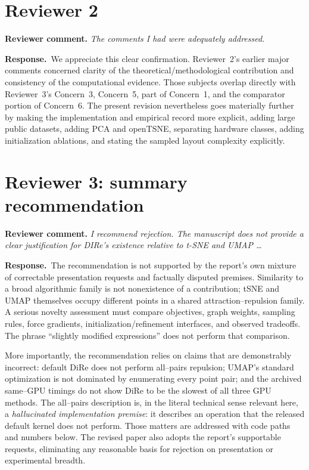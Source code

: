 \documentclass[11pt]{article}
\newcommand{\reviewcomment}[1]{%
  \medskip\noindent\textbf{Reviewer comment.} \emph{#1}\par\smallskip}
\newcommand{\response}{%
  \noindent\textcolor{responseblue}{\textbf{Response.}}\ }
\begin{document}
\section*{Reviewer 2}

\reviewcomment{The comments I had were adequately addressed.}

\response We appreciate this clear confirmation. Reviewer~2's earlier major
comments concerned clarity of the theoretical/methodological contribution and
consistency of the computational evidence. Those subjects overlap directly
with Reviewer~3's Concern~3, Concern~5, part of Concern~1, and the comparator
portion of Concern~6. The present revision nevertheless goes materially
further by making the implementation and empirical record more explicit,
adding large public datasets, adding PCA and openTSNE, separating hardware
classes, adding initialization ablations, and stating the sampled layout
complexity explicitly.

\section*{Reviewer 3: summary recommendation}

\reviewcomment{I recommend rejection. The manuscript does not provide a clear
justification for DIRe's existence relative to t-SNE and UMAP \ldots}

\response The recommendation is not supported by the report's own mixture of
correctable presentation requests and factually disputed premises. Similarity
to a broad algorithmic family is not nonexistence of a contribution; tSNE and
UMAP themselves occupy different points in a shared attraction--repulsion
family. A serious novelty assessment must compare objectives, graph weights,
sampling rules, force gradients, initialization/refinement interfaces, and
observed tradeoffs. The phrase ``slightly modified expressions'' does not
perform that comparison.

More importantly, the recommendation relies on claims that are demonstrably
incorrect: default DiRe does not perform all--pairs repulsion; UMAP's standard
optimization is not dominated by enumerating every point pair; and the archived
same--GPU timings do not show DiRe to be the slowest of all three GPU methods.
The all--pairs description is, in the literal technical sense relevant here, a
\emph{hallucinated implementation premise}: it describes an operation that the
released default kernel does not perform. Those matters are addressed with code
paths and numbers below. The revised paper also adopts the report's supportable
requests, eliminating any reasonable basis for rejection on presentation or
experimental breadth.
\end{document}
